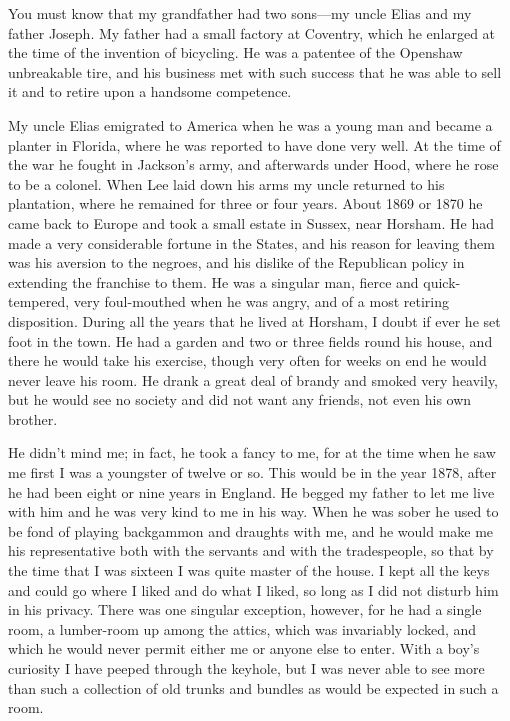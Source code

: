 You must know that my grandfather had two sons—my uncle Elias and my father Joseph. My father had a small factory at Coventry, which he enlarged at the time of the invention of bicycling. He was a patentee of the Openshaw unbreakable tire, and his business met with such success that he was able to sell it and to retire upon a handsome competence.

My uncle Elias emigrated to America when he was a young man and became a planter in Florida, where he was reported to have done very well. At the time of the war he fought in Jackson's army, and afterwards under Hood, where he rose to be a colonel. When Lee laid down his arms my uncle returned to his plantation, where he remained for three or four years. About 1869 or 1870 he came back to Europe and took a small estate in Sussex, near Horsham. He had made a very considerable fortune in the States, and his reason for leaving them was his aversion to the negroes, and his dislike of the Republican policy in extending the franchise to them. He was a singular man, fierce and quick-tempered, very foul-mouthed when he was angry, and of a most retiring disposition. During all the years that he lived at Horsham, I doubt if ever he set foot in the town. He had a garden and two or three fields round his house, and there he would take his exercise, though very often for weeks on end he would never leave his room. He drank a great deal of brandy and smoked very heavily, but he would see no society and did not want any friends, not even his own brother.

He didn't mind me; in fact, he took a fancy to me, for at the time when he saw me first I was a youngster of twelve or so. This would be in the year 1878, after he had been eight or nine years in England. He begged my father to let me live with him and he was very kind to me in his way. When he was sober he used to be fond of playing backgammon and draughts with me, and he would make me his representative both with the servants and with the tradespeople, so that by the time that I was sixteen I was quite master of the house. I kept all the keys and could go where I liked and do what I liked, so long as I did not disturb him in his privacy. There was one singular exception, however, for he had a single room, a lumber-room up among the attics, which was invariably locked, and which he would never permit either me or anyone else to enter. With a boy's curiosity I have peeped through the keyhole, but I was never able to see more than such a collection of old trunks and bundles as would be expected in such a room.

